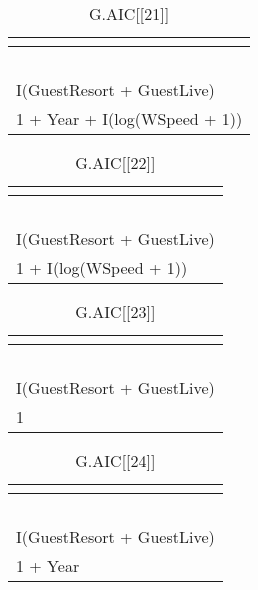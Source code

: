 %
\begin{table}[!tbp]
\caption{G.AIC[[21]]\label{G.AIC[[21]]}} 
\begin{center}
\begin{tabular}{l}
\hline\hline
\multicolumn{1}{c}{}\tabularnewline
\hline
~\tabularnewline
I(GuestResort + GuestLive)\tabularnewline
1 + Year + I(log(WSpeed + 1))\tabularnewline
\hline
\end{tabular}
\end{center}
\end{table}

%
\begin{table}[!tbp]
\caption{G.AIC[[22]]\label{G.AIC[[22]]}} 
\begin{center}
\begin{tabular}{l}
\hline\hline
\multicolumn{1}{c}{}\tabularnewline
\hline
~\tabularnewline
I(GuestResort + GuestLive)\tabularnewline
1 + I(log(WSpeed + 1))\tabularnewline
\hline
\end{tabular}
\end{center}
\end{table}

%
\begin{table}[!tbp]
\caption{G.AIC[[23]]\label{G.AIC[[23]]}} 
\begin{center}
\begin{tabular}{l}
\hline\hline
\multicolumn{1}{c}{}\tabularnewline
\hline
~\tabularnewline
I(GuestResort + GuestLive)\tabularnewline
1\tabularnewline
\hline
\end{tabular}
\end{center}
\end{table}

%
\begin{table}[!tbp]
\caption{G.AIC[[24]]\label{G.AIC[[24]]}} 
\begin{center}
\begin{tabular}{l}
\hline\hline
\multicolumn{1}{c}{}\tabularnewline
\hline
~\tabularnewline
I(GuestResort + GuestLive)\tabularnewline
1 + Year\tabularnewline
\hline
\end{tabular}
\end{center}
\end{table}

